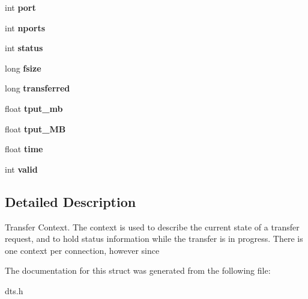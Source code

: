 \begin{CompactItemize}
\item 
\hypertarget{structxferContext_1cc63ff23a54955fa30a7cfd72aac97c}{
int \textbf{port}}
\label{structxferContext_1cc63ff23a54955fa30a7cfd72aac97c}

\item 
\hypertarget{structxferContext_5899851317a8cfb28d444cc662f7f826}{
int \textbf{nports}}
\label{structxferContext_5899851317a8cfb28d444cc662f7f826}

\item 
\hypertarget{structxferContext_69112348a1f2e39e2019c7ec5535d4c6}{
int \textbf{status}}
\label{structxferContext_69112348a1f2e39e2019c7ec5535d4c6}

\item 
\hypertarget{structxferContext_c1d229b522bd29554ce392aafde64915}{
long \textbf{fsize}}
\label{structxferContext_c1d229b522bd29554ce392aafde64915}

\item 
\hypertarget{structxferContext_377ea97bb6cb826e4e273eaa59c31dbb}{
long \textbf{transferred}}
\label{structxferContext_377ea97bb6cb826e4e273eaa59c31dbb}

\item 
\hypertarget{structxferContext_d8c25ab7186758cc2ef96906c368f083}{
float \textbf{tput\_\-mb}}
\label{structxferContext_d8c25ab7186758cc2ef96906c368f083}

\item 
\hypertarget{structxferContext_eaee482164ef55688b28f06e5bd64c6d}{
float \textbf{tput\_\-MB}}
\label{structxferContext_eaee482164ef55688b28f06e5bd64c6d}

\item 
\hypertarget{structxferContext_05cb87205632daf2647d2a6b5ae591bc}{
float \textbf{time}}
\label{structxferContext_05cb87205632daf2647d2a6b5ae591bc}

\item 
\hypertarget{structxferContext_45bcd546189e40515a4d1e288a90573f}{
int \textbf{valid}}
\label{structxferContext_45bcd546189e40515a4d1e288a90573f}

\end{CompactItemize}


\subsection{Detailed Description}
Transfer Context. The context is used to describe the current state of a transfer request, and to hold status information while the transfer is in progress. There is one context per connection, however since 

The documentation for this struct was generated from the following file:\begin{CompactItemize}
\item 
dts.h\end{CompactItemize}

